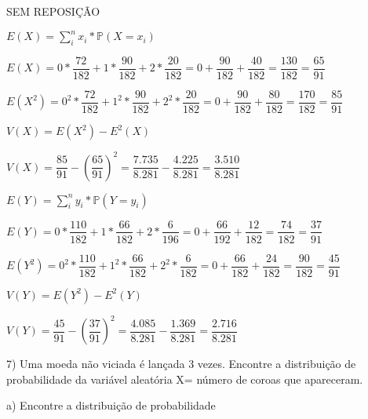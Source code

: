 \documentclass[12pt,a4paper]{article}
\begin{document}
\vspace{1cm}
SEM REPOSIÇÃO
\begin{center}
	\vspace{0.25cm}
	$E(X) = \sum_{i}^{n} x_{i}*\mathbb{P}(X = x_{i})$
	
	\vspace{1cm}
	$E(X) = 0*\dfrac{72}{182}+1*\dfrac{90}{182}+2*\dfrac{20}{182} = 0 + \dfrac{90}{182} + \dfrac{40}{182} = \dfrac{130}{182} = \dfrac{65}{91}$
	
	\vspace{0.5cm}
	$E(X^{2}) = 0^{2}*\dfrac{72}{182}+1^{2}*\dfrac{90}{182}+2^{2}*\dfrac{20}{182} = 0 + \dfrac{90}{182} + \dfrac{80}{182} = \dfrac{170}{182} = \dfrac{85}{91}$
	
	\vspace{1cm}
	$V(X) = E(X^{2}) - E^{2}(X)$
	
	\vspace{1cm}
	$V(X) = \dfrac{85}{91}-(\dfrac{65}{91})^{2} = \dfrac{7.735}{8.281}-\dfrac{4.225}{8.281} = \dfrac{3.510}{8.281}$

	\vspace{1.5cm}
	$E(Y) = \sum_{i}^{n} y_{i}*\mathbb{P}(Y = y_{i})$

	\vspace{1cm}
	$E(Y) = 0*\dfrac{110}{182}+1*\dfrac{66}{182}+2*\dfrac{6}{196}= 0 + \dfrac{66}{192} + \dfrac{12}{182} = \dfrac{74}{182} = \dfrac{37}{91}$

	\vspace{0.5cm}
	$E(Y^{2}) = 0^{2}*\dfrac{110}{182}+1^{2}*\dfrac{66}{182}+2^{2}*\dfrac{6}{182} = 0 + \dfrac{66}{182} + \dfrac{24}{182} = \dfrac{90}{182} = \dfrac{45}{91}$

	\vspace{1cm}
	$V(Y) = E(Y^{2}) - E^{2}(Y)$

	\vspace{1cm}
	$V(Y) = \dfrac{45}{91}-(\dfrac{37}{91})^{2} = \dfrac{4.085}{8.281}-\dfrac{1.369}{8.281} = \dfrac{2.716}{8.281}$
	\end{center}

\vspace{1cm}
7) Uma moeda não viciada é lançada 3 vezes. Encontre a distribuição de probabilidade da variável aleatória X= número de coroas que apareceram.

a) Encontre a distribuição de probabilidade
\end{document}
